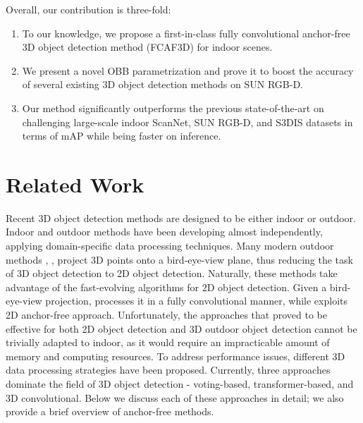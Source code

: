 \documentclass[runningheads]{llncs}
\begin{document}
Overall, our contribution is three-fold:
\begin{enumerate}
    \item To our knowledge, we propose a first-in-class fully convolutional anchor-free 3D object detection method (FCAF3D) for indoor scenes.
    \item We present a novel OBB parametrization and prove it to boost the accuracy of several existing 3D object detection methods on SUN RGB-D.
    \item Our method significantly outperforms the previous state-of-the-art on challenging large-scale indoor ScanNet, SUN RGB-D, and S3DIS datasets in terms of mAP while being faster on inference.
\end{enumerate}

\section{Related Work}

Recent 3D object detection methods are designed to be either indoor or outdoor. Indoor and outdoor methods have been developing almost independently, applying domain-specific data processing techniques. Many modern outdoor methods \cite{yan2018second}, \cite{lang2019pointpillars}, \cite{zhou2018voxelnet} project 3D points onto a bird-eye-view plane, thus reducing the task of 3D object detection to 2D object detection. Naturally, these methods take advantage of the fast-evolving algorithms for 2D object detection. Given a bird-eye-view projection, \cite{li20173d-fully-conv} processes it in a fully convolutional manner, while \cite{yin2021center-point} exploits 2D anchor-free approach. Unfortunately, the approaches that proved to be effective for both 2D object detection and 3D outdoor object detection cannot be trivially adapted to indoor, as it would require an impracticable amount of memory and computing resources. To address performance issues, different 3D data processing strategies have been proposed. Currently, three approaches dominate the field of 3D object detection - voting-based, transformer-based, and 3D convolutional. Below we discuss each of these approaches in detail; we also provide a brief overview of anchor-free methods.
\end{document}
